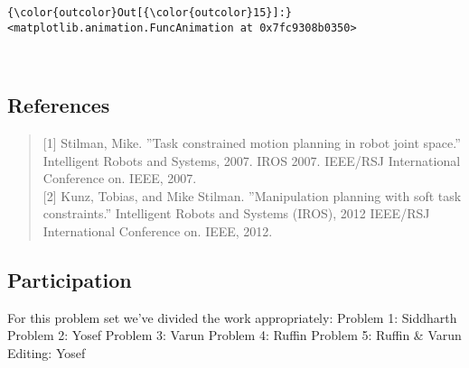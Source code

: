 \documentclass{article}
\begin{document}
            \begin{Verbatim}[commandchars=\\\{\}]
{\color{outcolor}Out[{\color{outcolor}15}]:} <matplotlib.animation.FuncAnimation at 0x7fc9308b0350>
\end{Verbatim}
        
    \begin{center}
    \end{center}
    { \hspace*{\fill} \\}
    

    \subsection{References}


    \begin{quote}
{[}1{]} Stilman, Mike. ''Task constrained motion planning in robot joint
space.'' Intelligent Robots and Systems, 2007. IROS 2007. IEEE/RSJ
International Conference on. IEEE, 2007.\\{[}2{]} Kunz, Tobias, and Mike
Stilman. ''Manipulation planning with soft task constraints.''
Intelligent Robots and Systems (IROS), 2012 IEEE/RSJ International
Conference on. IEEE, 2012.
\end{quote}


    \subsection{Participation}


    For this problem set we've divided the work appropriately: Problem 1:
Siddharth Problem 2: Yosef Problem 3: Varun Problem 4: Ruffin Problem 5:
Ruffin \& Varun Editing: Yosef


    
    
    
    
\end{document}
